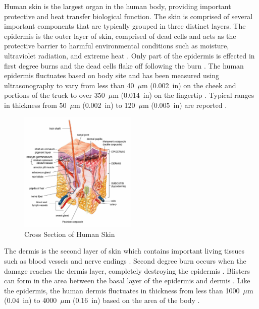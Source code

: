 \documentclass[12pt,oneside]{book}
\begin{document}
Human skin is the largest organ in the human body, providing important protective and heat transfer biological function.  The skin is comprised of several important components that are typically grouped in three distinct layers.  The epidermis is the outer layer of skin, comprised of dead cells and acts as the protective barrier to harmful environmental conditions such as moisture, ultraviolet radiation, and extreme heat \cite{Hummel_Barker_Lyons}. Only part of the epidermis is effected in first degree burns and the dead cells flake off following the burn \cite{Purser_Toxicity_Heat,Hummel_Barker_Lyons}. The human epidermis fluctuates based on body site and has been measured using ultrasonography to vary from less than 40~$\mu$m (0.002~in) on the cheek and portions of the truck to over 350~$\mu$m (0.014~in) on the fingertip \cite{Epidermis_Thickness}. Typical ranges in thickness from 50~$\mu$m (0.002~in) to 120~$\mu$m (0.005~in) are reported \cite{Pigs_Wound_Healing}. 

\begin{figure}[H]
\centering
\includegraphics[width=0.5\textwidth]{../0_Images/Instrumentation/Burn_Measurements/human_skin}
\caption[Cross Section of Human Skin]{Cross Section of Human Skin \cite{Hummel_Barker_Lyons}}
\label{fig:inst_human_skin}
\end{figure}

The dermis is the second layer of skin which contains important living tissues such as blood vessels and nerve endings \cite{Hummel_Barker_Lyons}. Second degree burn occurs when the damage reaches the dermis layer, completely destroying the epidermis \cite{Hummel_Barker_Lyons}. Blisters can form in the area between the basal layer of the epidermis and dermis \cite{Purser_Toxicity_Heat}. Like the epidermis, the human dermis fluctuates in thickness from less than 1000~$\mu$m (0.04~in) to 4000~$\mu$m (0.16~in) based on the area of the body \cite{Skin_Pulse,Visualization_Thickness}.
\end{document}
